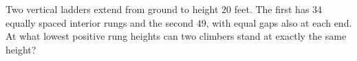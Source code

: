 Two vertical ladders extend from ground to height $20$ feet. The first has $34$ equally spaced interior rungs and the second $49$, with equal gaps also at each end. At what lowest positive rung heights can two climbers stand at exactly the same height?
